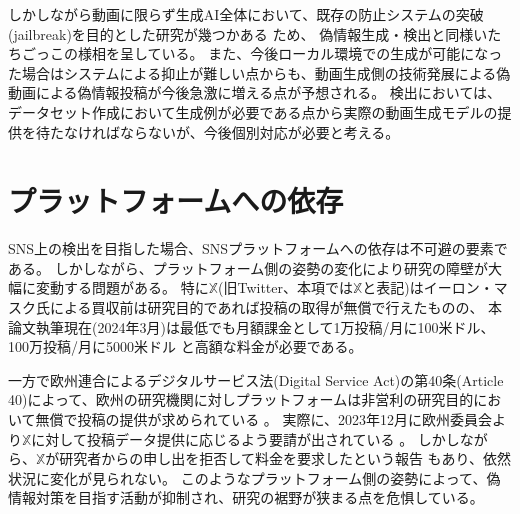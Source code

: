 しかしながら動画に限らず生成AI全体において、既存の防止システムの突破(jailbreak)を目的とした研究が幾つかある \cite{NEURIPS2023_fd661313,shayegani2024jailbreak}ため、
偽情報生成・検出と同様いたちごっこの様相を呈している。
また、今後ローカル環境での生成が可能になった場合はシステムによる抑止が難しい点からも、動画生成側の技術発展による偽動画による偽情報投稿が今後急激に増える点が予想される。
検出においては、データセット作成において生成例が必要である点から実際の動画生成モデルの提供を待たなければならないが、今後個別対応が必要と考える。

\section{プラットフォームへの依存}
SNS上の検出を目指した場合、SNSプラットフォームへの依存は不可避の要素である。
しかしながら、プラットフォーム側の姿勢の変化により研究の障壁が大幅に変動する問題がある。
特に$\mathbb{X}$(旧Twitter、本項では$\mathbb{X}$と表記)はイーロン・マスク氏による買収前は研究目的であれば投稿の取得が無償で行えたものの、
本論文執筆現在(2024年3月)は最低でも月額課金として1万投稿/月に100米ドル、100万投稿/月に5000米ドル \cite{Twitter}と高額な料金が必要である。

一方で欧州連合によるデジタルサービス法(Digital Service Act)の第40条(Article 40)によって、欧州の研究機関に対しプラットフォームは非営利の研究目的において無償で投稿の提供が求められている \cite{DSA}。
実際に、2023年12月に欧州委員会より$\mathbb{X}$に対して投稿データ提供に応じるよう要請が出されている \cite{order23}。
しかしながら、$\mathbb{X}$が研究者からの申し出を拒否して料金を要求したという報告 \cite{xreject}もあり、依然状況に変化が見られない。
このようなプラットフォーム側の姿勢によって、偽情報対策を目指す活動が抑制され、研究の裾野が狭まる点を危惧している。

